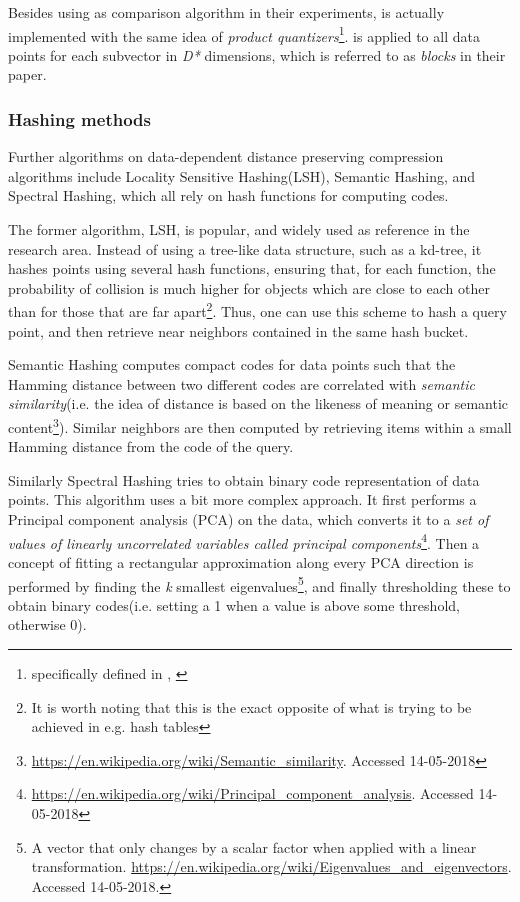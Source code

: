 Besides using \pq{} as comparison algorithm in their experiments, \qs{} is actually implemented with the same idea of \textit{product quantizers}\footnote{specifically defined in , \cite[p. 5]{wagner17}}. \qs{} is applied to all data points for each subvector in \textit{D*} dimensions, which is referred to as \textit{blocks} in their paper. 

\subsubsection{Hashing methods} %
Further algorithms on data-dependent distance preserving compression algorithms include Locality Sensitive Hashing(LSH), Semantic Hashing, and Spectral Hashing\cite{weiss8}, which all rely on hash functions for computing codes. 

The former algorithm, LSH, is popular, and widely used as reference in the research area. Instead of using a tree-like data structure, such as a kd-tree, it hashes points using several hash functions, ensuring that, for each function, the probability of collision is much higher for objects which are close to each other than for those that are far apart\footnote{It is worth noting that this is the exact opposite of what is trying to be achieved in e.g. hash tables}. Thus, one can use this scheme to hash a query point, and then retrieve near neighbors contained in the same hash bucket.

Semantic Hashing computes compact codes for data points such that the Hamming distance between two different codes are correlated with \textit{semantic similarity}(i.e. the idea of distance is based on the likeness of meaning or semantic content\footnote{\url{https://en.wikipedia.org/wiki/Semantic_similarity}. Accessed 14-05-2018}). Similar neighbors are then computed by retrieving items within a small Hamming distance from the code of the query.  

Similarly Spectral Hashing tries to obtain binary code representation of data points. This algorithm uses a bit more complex approach. It first performs a Principal component analysis (PCA) on the data, which converts it to a \textit{set of values of linearly uncorrelated variables called principal components}\footnote{\url{https://en.wikipedia.org/wiki/Principal_component_analysis}. Accessed 14-05-2018}. Then a concept of fitting a rectangular approximation along every PCA direction is performed by finding the \textit{k} smallest eigenvalues\footnote{A vector that only changes by a scalar factor when applied with a linear transformation. \url{https://en.wikipedia.org/wiki/Eigenvalues_and_eigenvectors}. Accessed 14-05-2018.}, and finally thresholding these to obtain binary codes(i.e. setting a 1 when a value is above some threshold, otherwise 0). 

